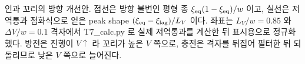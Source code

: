 \caption{인과 꼬리의 방향 개선안. 점선은 방향 불변인 평형 종 $\xi_\eq(1-\xi_\eq)/w$ 이고, 실선은
저역통과 점화식으로 얻은 peak shape $(\xi_\eq-\xi_\mathrm{lag})/L_V$ 이다. 좌표는 $L_V/w=0.85$ 와
$\Delta V/w=0.1$ 격자에서 T7\_calc.py 로 실제 저역통과를 계산한 뒤 표시용으로 정규화했다. 방전은 진행이
$V\uparrow$ 라 꼬리가 높은 $V$ 쪽으로, 충전은 격자를 뒤집어 필터한 뒤 되돌리므로 낮은 $V$ 쪽으로 늘어진다.}
\label{fig:reversal}
